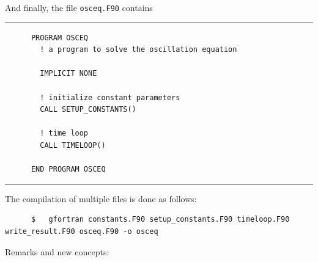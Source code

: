 \documentclass[a4paper]{article}
\begin{document}
%
\par
And finally, the file \verb+osceq.F90+ contains
% 
{\vspace{10pt}\hrule\small\vspace*{-2pt}\begin{verbatim}
	  PROGRAM OSCEQ
	    ! a program to solve the oscillation equation

	    IMPLICIT NONE
	    
	    ! initialize constant parameters
	    CALL SETUP_CONSTANTS()

	    ! time loop
	    CALL TIMELOOP()

	  END PROGRAM OSCEQ
\end{verbatim}\hrule\vspace{5pt}}
%
\par
The compilation of multiple files is done as follows:
%
{\small\begin{verbatim}
	  $   gfortran constants.F90 setup_constants.F90 timeloop.F90 write_result.F90 osceq.F90 -o osceq
\end{verbatim}}
%
\par
Remarks and new concepts:
%
\end{document}
